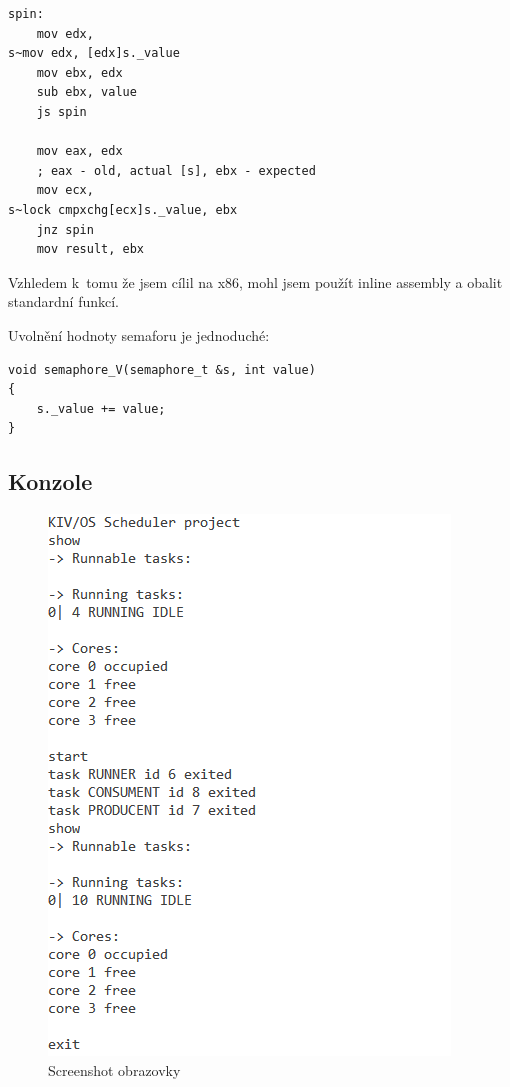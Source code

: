 \documentclass[a4paper,12pt]{article}
\begin{document}
\begin{lstlisting}
spin:
	mov edx,
s~mov edx, [edx]s._value
	mov ebx, edx
	sub ebx, value
	js spin

	mov eax, edx
	; eax - old, actual [s], ebx - expected
	mov ecx,
s~lock cmpxchg[ecx]s._value, ebx
	jnz spin
	mov result, ebx
\end{lstlisting}

\lstset{language=C++}

Vzhledem k~tomu že jsem cílil na x86, mohl jsem použít inline assembly
a obalit standardní funkcí.

Uvolnění hodnoty semaforu je jednoduché:

\begin{lstlisting}
void semaphore_V(semaphore_t &s, int value)
{
	s._value += value;
}
\end{lstlisting}

\subsection{Konzole}

\begin{figure}
\centering
\includegraphics[width=\textwidth]{obrazky/screen.png}
\caption{Screenshot obrazovky}
\label{fig:screen}
\end{figure}
\end{document}
